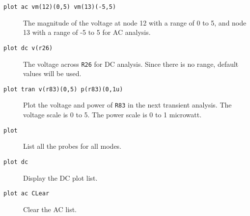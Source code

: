 \begin{description}

\item[{\tt plot ac vm(12)(0,5) vm(13)(-5,5)}] The magnitude of the voltage
at node 12 with a range of 0 to 5, and node 13 with a range of -5 to 5 for
AC analysis.

\item[{\tt plot dc v(r26)}] The voltage across {\tt R26} for DC analysis.
Since there is no range, default values will be used.

\item[{\tt plot tran v(r83)(0,5) p(r83)(0,1u)}] Plot the voltage and power 
of {\tt R83} in the next transient analysis.  The voltage scale is 0 to 5.  
The power scale is 0 to 1 microwatt.

\item[{\tt plot}] List all the probes for all modes.

\item[{\tt plot dc}] Display the DC plot list.

\item[{\tt plot ac CLear}] Clear the AC list.

\end{description}
